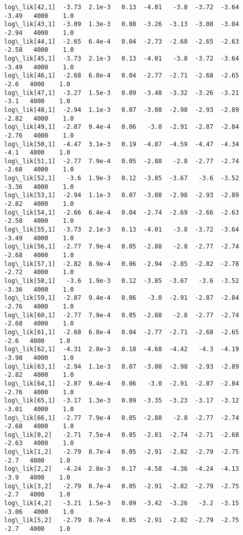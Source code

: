 \documentclass[11pt]{article}
\begin{document}
\begin{Verbatim}[commandchars=\\\{\}]
log\_lik[42,1]  -3.73  2.1e-3   0.13  -4.01   -3.8  -3.72  -3.64  -3.49   4000    1.0
log\_lik[43,1]  -3.09  1.3e-3   0.08  -3.26  -3.13  -3.08  -3.04  -2.94   4000    1.0
log\_lik[44,1]  -2.65  6.4e-4   0.04  -2.73  -2.68  -2.65  -2.63  -2.58   4000    1.0
log\_lik[45,1]  -3.73  2.1e-3   0.13  -4.01   -3.8  -3.72  -3.64  -3.49   4000    1.0
log\_lik[46,1]  -2.68  6.8e-4   0.04  -2.77  -2.71  -2.68  -2.65   -2.6   4000    1.0
log\_lik[47,1]  -3.27  1.5e-3   0.09  -3.48  -3.32  -3.26  -3.21   -3.1   4000    1.0
log\_lik[48,1]  -2.94  1.1e-3   0.07  -3.08  -2.98  -2.93  -2.89  -2.82   4000    1.0
log\_lik[49,1]  -2.87  9.4e-4   0.06   -3.0  -2.91  -2.87  -2.84  -2.76   4000    1.0
log\_lik[50,1]  -4.47  3.1e-3   0.19  -4.87  -4.59  -4.47  -4.34   -4.1   4000    1.0
log\_lik[51,1]  -2.77  7.9e-4   0.05  -2.88   -2.8  -2.77  -2.74  -2.68   4000    1.0
log\_lik[52,1]   -3.6  1.9e-3   0.12  -3.85  -3.67   -3.6  -3.52  -3.36   4000    1.0
log\_lik[53,1]  -2.94  1.1e-3   0.07  -3.08  -2.98  -2.93  -2.89  -2.82   4000    1.0
log\_lik[54,1]  -2.66  6.4e-4   0.04  -2.74  -2.69  -2.66  -2.63  -2.58   4000    1.0
log\_lik[55,1]  -3.73  2.1e-3   0.13  -4.01   -3.8  -3.72  -3.64  -3.49   4000    1.0
log\_lik[56,1]  -2.77  7.9e-4   0.05  -2.88   -2.8  -2.77  -2.74  -2.68   4000    1.0
log\_lik[57,1]  -2.82  8.9e-4   0.06  -2.94  -2.85  -2.82  -2.78  -2.72   4000    1.0
log\_lik[58,1]   -3.6  1.9e-3   0.12  -3.85  -3.67   -3.6  -3.52  -3.36   4000    1.0
log\_lik[59,1]  -2.87  9.4e-4   0.06   -3.0  -2.91  -2.87  -2.84  -2.76   4000    1.0
log\_lik[60,1]  -2.77  7.9e-4   0.05  -2.88   -2.8  -2.77  -2.74  -2.68   4000    1.0
log\_lik[61,1]  -2.68  6.8e-4   0.04  -2.77  -2.71  -2.68  -2.65   -2.6   4000    1.0
log\_lik[62,1]  -4.31  2.8e-3   0.18  -4.68  -4.42   -4.3  -4.19  -3.98   4000    1.0
log\_lik[63,1]  -2.94  1.1e-3   0.07  -3.08  -2.98  -2.93  -2.89  -2.82   4000    1.0
log\_lik[64,1]  -2.87  9.4e-4   0.06   -3.0  -2.91  -2.87  -2.84  -2.76   4000    1.0
log\_lik[65,1]  -3.17  1.3e-3   0.09  -3.35  -3.23  -3.17  -3.12  -3.01   4000    1.0
log\_lik[66,1]  -2.77  7.9e-4   0.05  -2.88   -2.8  -2.77  -2.74  -2.68   4000    1.0
log\_lik[0,2]   -2.71  7.5e-4   0.05  -2.81  -2.74  -2.71  -2.68  -2.63   4000    1.0
log\_lik[1,2]   -2.79  8.7e-4   0.05  -2.91  -2.82  -2.79  -2.75   -2.7   4000    1.0
log\_lik[2,2]   -4.24  2.8e-3   0.17  -4.58  -4.36  -4.24  -4.13   -3.9   4000    1.0
log\_lik[3,2]   -2.79  8.7e-4   0.05  -2.91  -2.82  -2.79  -2.75   -2.7   4000    1.0
log\_lik[4,2]   -3.21  1.5e-3   0.09  -3.42  -3.26   -3.2  -3.15  -3.06   4000    1.0
log\_lik[5,2]   -2.79  8.7e-4   0.05  -2.91  -2.82  -2.79  -2.75   -2.7   4000    1.0

\end{Verbatim}
\end{document}
